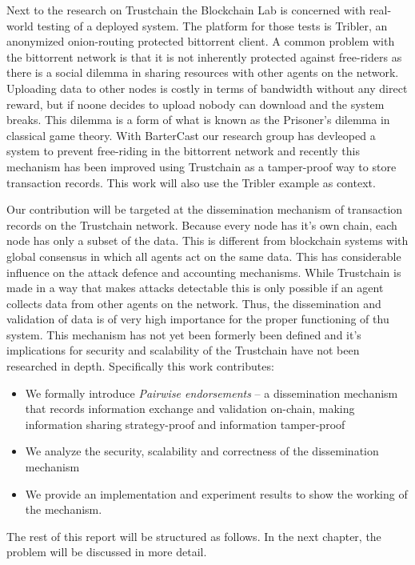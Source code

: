 Next to the research on Trustchain the Blockchain Lab is concerned with real-world testing of a
deployed system. The platform for those tests is Tribler, an anonymized onion-routing protected
bittorrent client. A common problem with the bittorrent network is that it is not inherently 
protected against free-riders as there is a social dilemma in sharing resources with other agents
on the network. Uploading data to other nodes is costly in terms of bandwidth without any direct 
reward, but if noone decides to upload nobody can download and the system breaks. This dilemma is
a form of what is known as the Prisoner's dilemma in classical game theory. With BarterCast our 
research group has devleoped a system to prevent free-riding in the bittorrent network and recently
this mechanism has been improved using Trustchain as a tamper-proof way to store transaction records.
This work will also use the Tribler example as context.

Our contribution will be targeted at the dissemination mechanism of transaction records on the 
Trustchain network. Because every node has it's own chain, each node has only a subset of the data.
This is different from blockchain systems with global consensus in which all agents act on the same
data. This has considerable influence on the attack defence and accounting mechanisms.
While Trustchain is made in a way that makes attacks detectable this is only possible if 
an agent collects data from other agents on the network. Thus, the dissemination and validation of
data is of very high importance for the proper functioning of thu system. 
This mechanism has not yet been formerly been defined and it's implications for security and 
scalability of the Trustchain have not been researched in depth. Specifically this work 
contributes:

\begin{itemize}
    \item We formally introduce \textit{Pairwise endorsements} -- a dissemination mechanism that 
    records information exchange and validation on-chain, making information sharing strategy-proof
    and information tamper-proof
    \item We analyze the security, scalability and correctness of the dissemination mechanism
    \item We provide an implementation and experiment results to show the working of the mechanism.
\end{itemize}

The rest of this report will be structured as follows. In the next chapter, the problem will be 
discussed in more detail.
